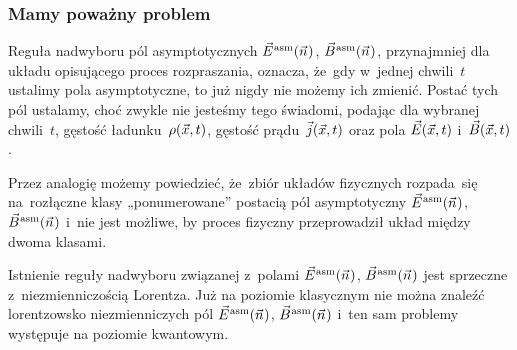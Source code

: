 \documentclass[10pt,t]{beamer}
\begin{document}
\begin{frame}
  \frametitle{Mamy poważny problem}




  Reguła nadwyboru pól asymptotycznych $\vec{E}^{ \hspace{0.05em} \text{asm} }( \vec{n} \hspace{0.05em} )$, $\vec{B}^{ \hspace{0.05em} \text{asm} }( \vec{n} \hspace{0.05em} )$, przynajmniej
  dla układu
  opisującego proces rozpraszania, oznacza, że~gdy w~jednej chwili~$t$
  ustalimy pola asymptotyczne, to już \alert{nigdy} nie możemy ich zmienić.
  Postać tych pól ustalamy, choć zwykle nie jesteśmy tego świadomi, podając
  dla wybranej chwili~$t$, gęstość ładunku~$\rho( \vec{x}, t )$, gęstość
  prądu~$\vec{j}( \vec{x}, t )$ oraz pola $\vec{E}( \vec{x}, t )$
  i~$\vec{B}( \vec{x}, t )$.

  Przez analogię możemy powiedzieć, że~zbiór układów fizycznych rozpada~się
  na~rozłączne klasy „ponumerowane” postacią pól asymptotyczny
  $\vec{E}^{ \hspace{0.05em} \text{asm} }( \vec{n} \hspace{0.05em} )$, $\vec{B}^{ \hspace{0.05em} \text{asm} }( \vec{n} \hspace{0.05em} )$ i~\alert{nie} jest możliwe, by proces
  fizyczny przeprowadził układ między dwoma klasami.

  Istnienie reguły nadwyboru związanej z~polami $\vec{E}^{ \hspace{0.05em} \text{asm} }( \vec{n} \hspace{0.05em} )$, $\vec{B}^{ \hspace{0.05em} \text{asm} }( \vec{n} \hspace{0.05em} )$ jest
  \alert{sprzeczne} z~niezmienniczością Lorentza. Już na poziomie klasycznym
  nie można znaleźć lorentzowsko niezmienniczych pól $\vec{E}^{ \hspace{0.05em} \text{asm} }( \vec{n} \hspace{0.05em} )$, $\vec{B}^{ \hspace{0.05em} \text{asm} }( \vec{n} \hspace{0.05em} )$
  i~ten sam problemy występuje na poziomie kwantowym.

\end{frame}
\end{document}
